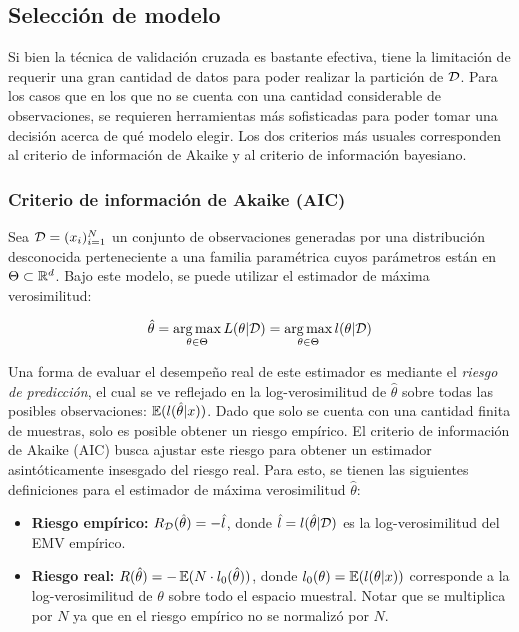 \subsection{Selección de modelo}

Si bien la técnica de validación cruzada es bastante efectiva, tiene la limitación de requerir una gran cantidad de datos para poder realizar la partición de ${\mathcal D}$. Para los casos que en los que no se cuenta con una cantidad considerable de observaciones, se requieren herramientas más sofisticadas para poder tomar una decisión acerca de qué modelo elegir. Los dos criterios más usuales corresponden al criterio de información de Akaike y al criterio de información bayesiano.\\



\subsubsection{Criterio de información de Akaike (AIC)}


Sea ${\mathcal D}=(x_i)_{i=1}^N$ un conjunto de observaciones generadas por una distribución desconocida perteneciente a una familia paramétrica cuyos parámetros están en $\Theta\subset\mathbb{R}^d$. Bajo este modelo, se puede utilizar el estimador de máxima verosimilitud:

\begin{equation}
	\hat{\theta} = \operatorname*{arg\,max}_{\theta\in\Theta} L(\theta|{\mathcal D}) =  \operatorname*{arg\,max}_{\theta\in\Theta} l(\theta|{\mathcal D})
\end{equation}

Una forma de evaluar el desempeño real de este estimador es mediante el \emph{riesgo de predicción}, el cual se ve reflejado en la log-verosimilitud de $\hat{\theta}$ sobre todas las posibles observaciones: $\operatorname{\mathbb{E}}(l(\hat{\theta}|x))$. Dado que solo se cuenta con una cantidad finita de muestras, solo es posible obtener un riesgo empírico. El criterio de información de Akaike (AIC) busca ajustar este riesgo para obtener un estimador asintóticamente insesgado del riesgo real. Para esto, se tienen las siguientes definiciones para el estimador de máxima verosimilitud $\hat{\theta}$:

\begin{itemize}
	\item \textbf{Riesgo empírico:} $R_{\mathcal D}(\hat{\theta})=-\hat{l}$, donde $\hat{l}=l(\hat{\theta}|{\mathcal D})$ es la log-verosimilitud del EMV empírico.
	\item \textbf{Riesgo real:} $R(\hat{\theta})=-\operatorname{\mathbb{E}}(N\cdot l_0(\hat{\theta}))$, donde $l_0(\theta)=\operatorname{\mathbb{E}}(l(\theta|x))$ corresponde a la log-verosimilitud de $\theta$ sobre todo el espacio muestral. Notar que se multiplica por $N$ ya que en el riesgo empírico no se normalizó por $N$.
\end{itemize}


